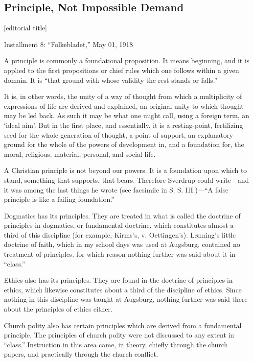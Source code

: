 
\subsection{Principle, Not Impossible Demand}

[editorial title]

Installment 8: “Folkebladet,” May 01, 1918

A principle is commonly a foundational proposition. It means beginning, and it is applied to the first propositions or chief rules which one follows within a given domain. It is “that ground with whose validity the rest stands or falls.”

It is, in other words, the unity of a way of thought from which a multiplicity of expressions of life are derived and explained, an original unity to which thought may be led back. As such it may be what one might call, using a foreign term, an ‘ideal aim’. But in the first place, and essentially, it is a resting-point, fertilizing seed for the whole generation of thought, a point of support, an explanatory ground for the whole of the powers of development in, and a foundation for, the moral, religious, material, personal, and social life.

A Christian principle is not beyond our powers. It is a foundation upon which to stand, something that supports, that bears. Therefore Sverdrup could write—and it was among the last things he wrote (see facsimile in S. S. III.)—“A false principle is like a failing foundation.”

Dogmatics has its principles. They are treated in what is called the doctrine of principles in dogmatics, or fundamental doctrine, which constitutes almost a third of this discipline (for example, Kirms’s, v. Oettingen’s). Lønning’s little doctrine of faith, which in my school days was used at Augsburg, contained no treatment of principles, for which reason nothing further was said about it in “class.”

Ethics also has its principles. They are found in the doctrine of principles in ethics, which likewise constitutes about a third of the discipline of ethics. Since nothing in this discipline was taught at Augsburg, nothing further was said there about the principles of ethics either.

Church polity also has certain principles which are derived from a fundamental principle. The principles of church polity were not discussed to any extent in “class.” Instruction in this area came, in theory, chiefly through the church papers, and practically through the church conflict.

